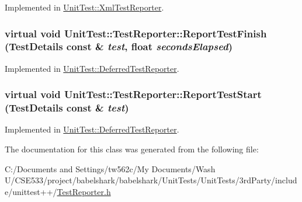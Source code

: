 Implemented in \hyperlink{class_unit_test_1_1_xml_test_reporter_9fa635aadd426628438e37de16431f5e}{UnitTest::XmlTestReporter}.\hypertarget{class_unit_test_1_1_test_reporter_6492379c31985a77a22f1ccf684e44da}{
\subsubsection[{ReportTestFinish}]{\setlength{\rightskip}{0pt plus 5cm}virtual void UnitTest::TestReporter::ReportTestFinish ({\bf TestDetails} const \& {\em test}, \/  float {\em secondsElapsed})}}
\label{class_unit_test_1_1_test_reporter_6492379c31985a77a22f1ccf684e44da}




Implemented in \hyperlink{class_unit_test_1_1_deferred_test_reporter_77c9ec008f66a3dc3216e21082ef0215}{UnitTest::DeferredTestReporter}.\hypertarget{class_unit_test_1_1_test_reporter_94f1ab9311190188a2f96f8c2da785b1}{
\subsubsection[{ReportTestStart}]{\setlength{\rightskip}{0pt plus 5cm}virtual void UnitTest::TestReporter::ReportTestStart ({\bf TestDetails} const \& {\em test})}}
\label{class_unit_test_1_1_test_reporter_94f1ab9311190188a2f96f8c2da785b1}




Implemented in \hyperlink{class_unit_test_1_1_deferred_test_reporter_2aa55cb8b1cb292bbf71078100914d4a}{UnitTest::DeferredTestReporter}.

The documentation for this class was generated from the following file:\begin{CompactItemize}
\item 
C:/Documents and Settings/tw562c/My Documents/Wash U/CSE533/project/babelshark/babelshark/UnitTests/UnitTests/3rdParty/include/unittest++/\hyperlink{_test_reporter_8h}{TestReporter.h}\end{CompactItemize}
